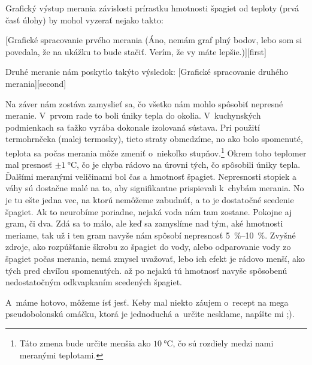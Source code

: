 Grafický výstup merania závislosti prírastku hmotnosti špagiet od teploty (prvá časť úlohy) by mohol vyzerať nejako takto:

[Grafické spracovanie prvého merania (Áno, nemám graf plný bodov, lebo som si povedala, že na ukážku to bude stačiť. Verím, že vy máte lepšie.)][first]

Druhé meranie nám poskytlo takýto výsledok:
\nopagebreak
{}[Grafické spracovanie druhého merania][second]



Na záver nám zostáva zamyslieť sa, čo všetko nám mohlo spôsobiť nepresné meranie.
V~prvom rade to boli úniky tepla do okolia. V~kuchynských podmienkach sa ťažko vyrába dokonale izolovaná sústava. 
Pri použití termohrnčeka (malej termosky), tieto straty obmedzíme, no ako bolo spomenuté, teplota sa počas merania môže zmeniť
o~niekoľko stupňov.\footnote{Táto zmena bude určite menšia ako $\SI{10}{\celsius}$, čo sú rozdiely medzi nami 
meranými teplotami.} Okrem toho teplomer mal presnosť $\pm \SI{1}{\celsius}$, čo je chyba rádovo na úrovni tých, čo spôsobili 
úniky tepla. 
Ďalšími meranými veličinami bol čas a hmotnosť špagiet. Nepresnosti stopiek a váhy sú dostačne malé na to, 
aby signifikantne prispievali k~chybám merania. No je tu ešte jedna vec, na ktorú nemôžeme zabudnúť, 
a to je dostatočné scedenie špagiet. Ak to neurobíme poriadne, nejaká voda nám tam zostane. Pokojne aj gram, či dva. 
Zdá sa to málo, ale keď sa zamyslíme nad tým, aké hmotnosti meriame, tak už i ten gram navyše nám spôsobí nepresnosť 
\SIrange{5}{10}{\percent}. Zvyšné zdroje, ako rozpúšťanie škrobu zo špagiet do vody, alebo odparovanie vody zo špagiet počas merania,
nemá zmysel uvažovať, lebo ich efekt je rádovo menší, ako tých pred chvíľou spomenutých.
až po nejakú tú hmotnosť navyše spôsobenú nedostatočným odkvapkaním scedených špagiet.

A~máme hotovo, môžeme ísť jesť. Keby mal niekto záujem o~recept na mega pseudobolonskú omáčku, ktorá je jednoduchá a~určite nesklame, napíšte mi ;).
